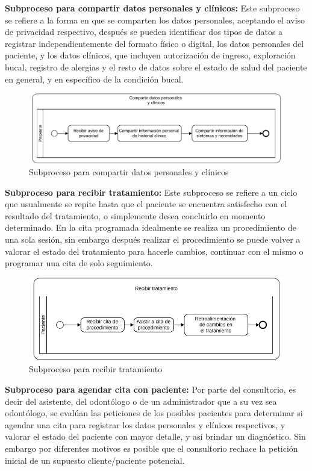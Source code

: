 \noindent\textbf{Subproceso para compartir datos personales y clínicos:} Este subproceso se refiere a la forma en que se comparten los datos personales, aceptando el aviso de privacidad respectivo, después se pueden identificar dos tipos de datos a registrar independientemente del formato físico o digital, los datos personales del paciente, y los datos clínicos, que incluyen autorización de ingreso, exploración bucal, registro de alergias y el resto de datos sobre el estado de salud del paciente en general, y en específico de la condición bucal.


\begin{figure}[H]
\centering
\centerline{ \includegraphics[width=12cm, keepaspectratio]{pictures/picture06.pdf}}
\caption{Subproceso para compartir datos personales y clínicos}
\end{figure}

\noindent\textbf{Subproceso para recibir tratamiento:} Este subproceso se refiere a un ciclo que usualmente se repite hasta que el paciente se encuentra satisfecho con el resultado del tratamiento, o simplemente desea concluirlo en momento determinado. En la cita programada idealmente se realiza un procedimiento de una sola sesión, sin embargo después realizar el procedimiento se puede volver a valorar el estado del tratamiento para hacerle cambios, continuar con el mismo o programar una cita de solo seguimiento. 

\begin{figure}[H]
\centering
\centerline{\includegraphics[width=12cm, keepaspectratio]{pictures/picture07.pdf}}
\caption{Subproceso para recibir tratamiento}
\end{figure}

\noindent\textbf{Subproceso para agendar cita con paciente:} Por parte del consultorio, es decir del asistente, del odontólogo o de un administrador que a su vez sea odontólogo, se evalúan las peticiones de los posibles pacientes para determinar si agendar una cita para registrar los datos personales y clínicos respectivos, y valorar el estado del paciente con mayor detalle, y así brindar un diagnóstico. Sin embargo por diferentes motivos es posible que el consultorio rechace la petición inicial de un supuesto cliente/paciente potencial.

